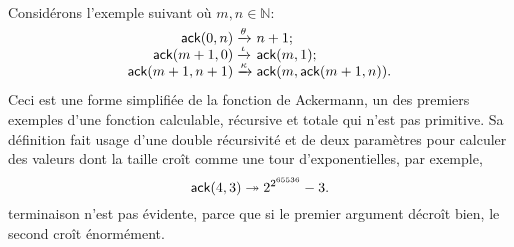 Considérons l'exemple suivant où \(m,n \in \mathbb{N}\):
\begin{equation*}
\begin{array}{@{}r@{\;}l@{\;}l@{}}
\fun{ack}(0,n)     & \smashedrightarrow{\theta} & n+1;\\
\fun{ack}(m+1,0)   & \smashedrightarrow{\iota} & \fun{ack}(m,1);\\
\fun{ack}(m+1,n+1) & \smashedrightarrow{\kappa}
                   & \fun{ack}(m,\fun{ack}(m+1,n)).
\end{array}
\end{equation*}
Ceci est une forme simplifiée de la fonction de Ackermann, un
des premiers exemples d'une fonction calculable, récursive et totale
qui n'est pas primitive. Sa définition fait usage d'une double
récursivité et de deux paramètres pour calculer des valeurs dont la
taille croît comme une tour d'exponentielles, par exemple,
\begin{equation*}
  \textsf{ack}(4,3) \twoheadrightarrow 2^{2^{65536}} - 3.
\end{equation*}
terminaison n'est pas évidente, parce que si le premier argument
décroît bien, le second croît énormément.

